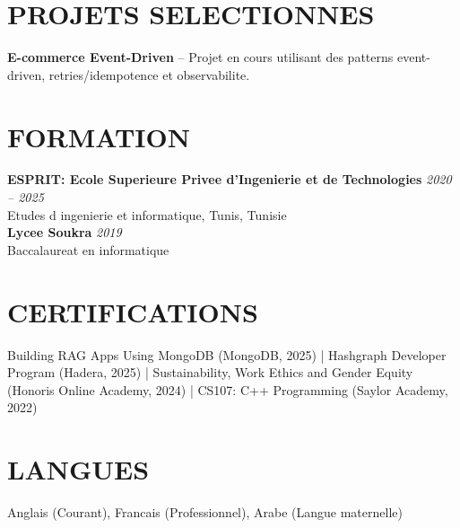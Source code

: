 \documentclass[10pt,a4paper]{article}
\begin{document}
\section*{PROJETS SELECTIONNES}
\textbf{E-commerce Event-Driven} -- Projet en cours utilisant des patterns event-driven, retries/idempotence et observabilite.

\section*{FORMATION}
\textbf{ESPRIT: Ecole Superieure Privee d'Ingenierie et de Technologies} \hfill \textit{2020 -- 2025}\\
Etudes d ingenierie et informatique, Tunis, Tunisie\\
\textbf{Lycee Soukra} \hfill \textit{2019}\\
Baccalaureat en informatique

\section*{CERTIFICATIONS}
Building RAG Apps Using MongoDB (MongoDB, 2025) \;|\; Hashgraph Developer Program (Hadera, 2025) \;|\; Sustainability, Work Ethics and Gender Equity (Honoris Online Academy, 2024) \;|\; CS107: C++ Programming (Saylor Academy, 2022)

\section*{LANGUES}
Anglais (Courant), Francais (Professionnel), Arabe (Langue maternelle)
\end{document}
